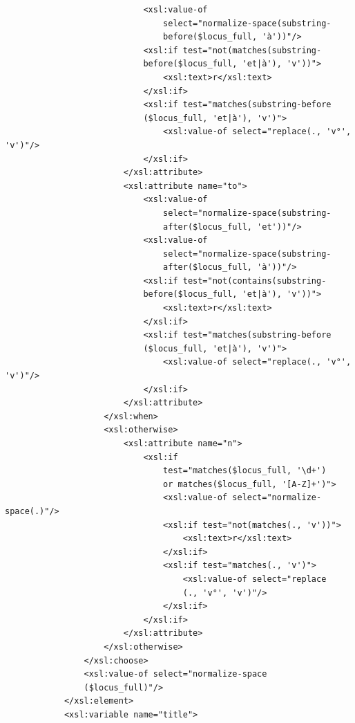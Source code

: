 \documentclass[a4paper,12pt,twoside]{book}
\begin{document}
\begin{verbatim}
                            <xsl:value-of
                                select="normalize-space(substring-
                                before($locus_full, 'à'))"/>
                            <xsl:if test="not(matches(substring-
                            before($locus_full, 'et|à'), 'v'))">
                                <xsl:text>r</xsl:text>
                            </xsl:if>
                            <xsl:if test="matches(substring-before
                            ($locus_full, 'et|à'), 'v')">
                                <xsl:value-of select="replace(., 'v°', 'v')"/>
                            </xsl:if>
                        </xsl:attribute>
                        <xsl:attribute name="to">
                            <xsl:value-of
                                select="normalize-space(substring-
                                after($locus_full, 'et'))"/>
                            <xsl:value-of
                                select="normalize-space(substring-
                                after($locus_full, 'à'))"/>
                            <xsl:if test="not(contains(substring-
                            before($locus_full, 'et|à'), 'v'))">
                                <xsl:text>r</xsl:text>
                            </xsl:if>
                            <xsl:if test="matches(substring-before
                            ($locus_full, 'et|à'), 'v')">
                                <xsl:value-of select="replace(., 'v°', 'v')"/>
                            </xsl:if>
                        </xsl:attribute>
                    </xsl:when>
                    <xsl:otherwise>
                        <xsl:attribute name="n">
                            <xsl:if
                                test="matches($locus_full, '\d+') 
                                or matches($locus_full, '[A-Z]+')">
                                <xsl:value-of select="normalize-space(.)"/>
                                <xsl:if test="not(matches(., 'v'))">
                                    <xsl:text>r</xsl:text>
                                </xsl:if>
                                <xsl:if test="matches(., 'v')">
                                    <xsl:value-of select="replace
                                    (., 'v°', 'v')"/>
                                </xsl:if>
                            </xsl:if>
                        </xsl:attribute>
                    </xsl:otherwise>
                </xsl:choose>
                <xsl:value-of select="normalize-space
                ($locus_full)"/>
            </xsl:element>
            <xsl:variable name="title">

\end{verbatim}
\end{document}
